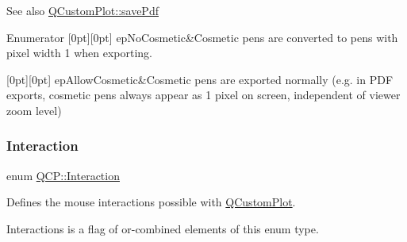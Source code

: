 \begin{DoxySeeAlso}{See also}
\mbox{\hyperlink{class_q_custom_plot_ad5acd34f6b39c3516887d7e54fec2412}{Q\+Custom\+Plot\+::save\+Pdf}} 
\end{DoxySeeAlso}
\begin{DoxyEnumFields}{Enumerator}
[0pt][0pt]{}\mbox{\label{namespace_q_c_p_a17844f19e1019693a953e1eb93536d2faae8fcfaafee234ce18558afef83f6a78}} 
ep\+No\+Cosmetic&Cosmetic pens are converted to pens with pixel width 1 when exporting. \\
\hline

[0pt][0pt]{}\mbox{\label{namespace_q_c_p_a17844f19e1019693a953e1eb93536d2fa50d3657dba3fb90560b93a823cb0a6e8}} 
ep\+Allow\+Cosmetic&Cosmetic pens are exported normally (e.\+g. in P\+DF exports, cosmetic pens always appear as 1 pixel on screen, independent of viewer zoom level) \\
\hline

\end{DoxyEnumFields}
\mbox{\label{namespace_q_c_p_a2ad6bb6281c7c2d593d4277b44c2b037}} 
\subsubsection{\texorpdfstring{Interaction}{Interaction}}
{\footnotesize\ttfamily enum \mbox{\hyperlink{namespace_q_c_p_a2ad6bb6281c7c2d593d4277b44c2b037}{Q\+C\+P\+::\+Interaction}}}

Defines the mouse interactions possible with \mbox{\hyperlink{class_q_custom_plot}{Q\+Custom\+Plot}}.

{\ttfamily Interactions} is a flag of or-\/combined elements of this enum type.

